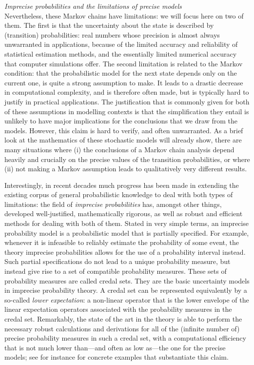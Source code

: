 \documentclass[11pt,dvipsnames,usenames,a4paper]{article}
\begin{document}
\emph{Imprecise probabilities and the limitations of precise models}\\[5pt]
Nevertheless, these Markov chains have limitations: we will focus here on two of them.
The first is that the uncertainty about the state is described by (transition) probabilities: real numbers whose precision is almost always unwarranted in applications, because of the limited accuracy and reliability of statistical estimation methods, and the essentially limited numerical accuracy that computer simulations offer.
The second limitation is related to the Markov condition: that the probabilistic model for the next state depends only on the current one, is quite a strong assumption to make. 
It leads to a drastic decrease in computational complexity, and is therefore often made, but is typically hard to justify in practical applications.
The justification that is commonly given for both of these assumptions in modelling contexts is that the simplification they entail is unlikely to have major implications for the conclusions that we draw from the models.
However, this claim is hard to verify, and often unwarranted.
As a brief look at the mathematics of these stochastic models will already show, there are many situations where (i) the conclusions of a Markov chain analysis depend heavily and crucially on the precise values of the transition probabilities, or where (ii) not making a Markov assumption leads to qualitatively very different results.

Interestingly, in recent decades much progress has been made in extending the existing corpus of general probabilistic knowledge to deal with both types of limitations: the field of \emph{imprecise probabilities} \cite{walley1991,augustin2013:itip,troffaes2013:lp} has, amongst other things, developed well-justified, mathematically rigorous, as well as robust and efficient methods for dealing with both of them.
Stated in very simple terms, an imprecise probability model is a probabilistic model that is partially specified.
For example, whenever it is infeasible to reliably estimate the probability of some event, the theory imprecise probabilities allows for the use of a probability interval instead.
Such partial specifications do not lead to a unique probability measure, but instead give rise to a set of compatible probability measures.
These sets of probability measures are called credal sets.
They are the basic uncertainty models in imprecise probability theory. 
A credal set can be represented equivalently by a so-called \emph{lower expectation}: a non-linear operator that is the lower envelope of the linear expectation operators associated with the probability measures in the credal set.
Remarkably, the state of the art in the theory is able to perform the necessary robust calculations and derivations for all of the (infinite number of) precise probability measures in such a credal set, with a computational efficiency that is not much lower than---and often as low as---the one for the precise models; see for instance \cite{cooman2009,debock2014:estihmm,debock2015:thesis,cooman2008} for concrete examples that substantiate this claim.
\end{document}

